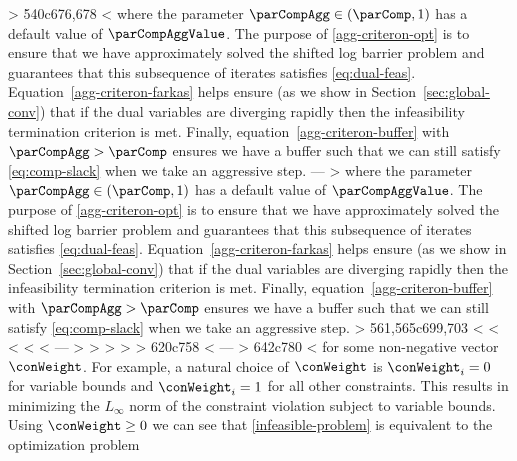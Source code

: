 > 
540c676,678
< where the parameter $\parCompAgg \in (\parComp, 1)$ has a default value of $\parCompAggValue$. The purpose of \eqref{agg-criteron-opt} is to ensure that we have approximately solved the shifted log barrier problem and guarantees that this subsequence of iterates satisfies \eqref{eq:dual-feas}. Equation~\eqref{agg-criteron-farkas} helps ensure (as we show in Section~\ref{sec:global-conv}) that if the dual variables are diverging rapidly then the infeasibility termination criterion is met. Finally, equation~\eqref{agg-criteron-buffer} with $\parCompAgg > \parComp$ ensures we have a buffer such that we can still satisfy \eqref{eq:comp-slack} when we take an aggressive step. 
---
> where the parameter $\parCompAgg \in (\parComp, 1)$ has a default value of $\parCompAggValue$. The purpose of \eqref{agg-criteron-opt} is to ensure that we have approximately solved the shifted log barrier problem and guarantees that this subsequence of iterates satisfies \eqref{eq:dual-feas}. Equation~\eqref{agg-criteron-farkas} helps ensure (as we show in Section~\ref{sec:global-conv}) that if the dual variables are diverging rapidly then the infeasibility termination criterion is met. Finally, equation~\eqref{agg-criteron-buffer} with $\parCompAgg > \parComp$ ensures we have a buffer such that we can still satisfy \eqref{eq:comp-slack} when we take an aggressive step. 
> 
561,565c699,703
< %
< %
< %
< %
< %
---
> %
> %
> %
> %
> %
620c758
< %
---
> %
642c780
< for some non-negative vector $\conWeight$. For example, a natural choice of $\conWeight$ is $\conWeight_i = 0$ for variable bounds and $\conWeight_i = 1$ for all other constraints. This results in minimizing the $L_{\infty}$ norm of the constraint violation subject to variable bounds. Using $\conWeight \ge 0$ we can see that \eqref{infeasible-problem} is equivalent to the optimization problem
